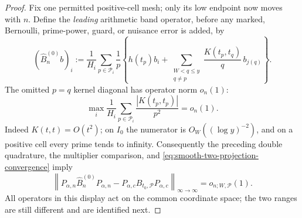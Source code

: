 \documentclass[11pt]{article}
\numberwithin{equation}{section}
\theoremstyle{definition}
\theoremstyle{remark}
\newcommand{\1}{\mathbf 1}
\begin{document}
\begin{proof}
Fix one permitted positive-cell mesh; only its low endpoint now moves
with \(n\).  Define the \emph{leading} arithmetic band operator, before
any marked, Bernoulli, prime-power, guard, or nuisance error is added, by
\begin{equation}
 (\widehat B_n^{(0)}b)_i:=\frac1{H_i}
 \sum_{p\in\mathcal P_i}\frac1p\left\{
 h(t_p)b_i+\sum_{\substack{W<q\leq y\\q\ne p}}
       \frac{K(t_p,t_q)}q\,b_{j(q)}\right\}.
 \label{eq:smooth-leading-arithmetic-band-operator}
\end{equation}
The omitted \(p=q\) kernel diagonal has operator norm \(o_n(1)\):
\[
 \max_i\frac1{H_i}\sum_{p\in\mathcal P_i}
       \frac{|K(t_p,t_p)|}{p^2}=o_n(1).
\]
Indeed \(K(t,t)=O(t^2)\); on \(I_0\) the numerator is
\(O_W((\log y)^{-2})\), and on a positive cell every prime tends to
infinity.  Consequently the preceding double quadrature, the multiplier
comparison, and \eqref{eq:smooth-two-projection-convergence} imply
\begin{equation}
 \left\|P_{\alpha,n}\widehat B_n^{(0)}P_{\alpha,n}
       -P_{\alpha,c}B_{t_0,\mathcal P}P_{\alpha,c}
 \right\|_{\infty\to\infty}=o_{n;W,\mathcal P}(1).
 \label{eq:smooth-leading-projected-operator-convergence}
\end{equation}
All operators in this display act on the common coordinate space; the
two ranges are still different and are identified next.


\end{proof}
\end{document}
